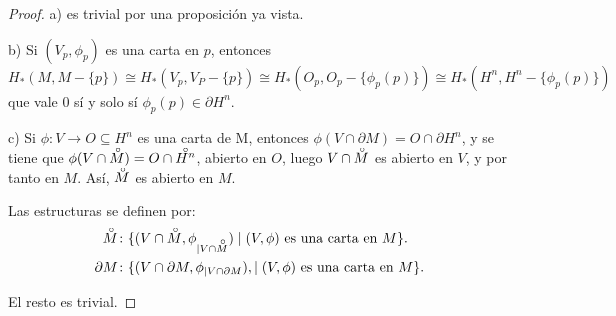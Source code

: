 \begin{proof}
  a) es trivial por una proposición ya vista.

  b) Si $(V_p, \phi_p)$ es una carta en $p$, entonces
  \[ H_*(M, M - \{p\}) \cong H_*(V_p, V_P - \{p\}) \cong H_*(O_p, O_p - \{\phi_p(p)\}) \cong H_*(H^n, H^n - \{\phi_p(p)\}) \]
  que vale $0$ sí y solo sí $\phi_p(p) \in \partial H^n$.

  c) Si $\phi \colon V \to O \subseteq H^n$ es una carta de M, entonces $\phi(V \cap \partial M) = O \cap \partial H^n$, y se tiene que
  $\phi(V \cap \interior{M}) = O \cap \interior{H^n}$, abierto en $O$, luego $V \cap \interior{M}$ es abierto en $V$, y por tanto en $M$.
  Así, $\interior{M}$ es abierto en $M$.

  Las estructuras se definen por:
  \begin{align*}
    \interior{M} &\colon \{(V \cap \interior{M}, \phi_{|V \cap \interior{M}}) \mid (V, \phi) \text{ es una carta en }M\}. \\
    \partial M &\colon   \{(V \cap \partial M,  \phi_{|V \cap \partial M}), \mid (V, \phi) \text{ es una carta en }M\}.
  \end{align*}

  El resto es trivial.
\end{proof}
